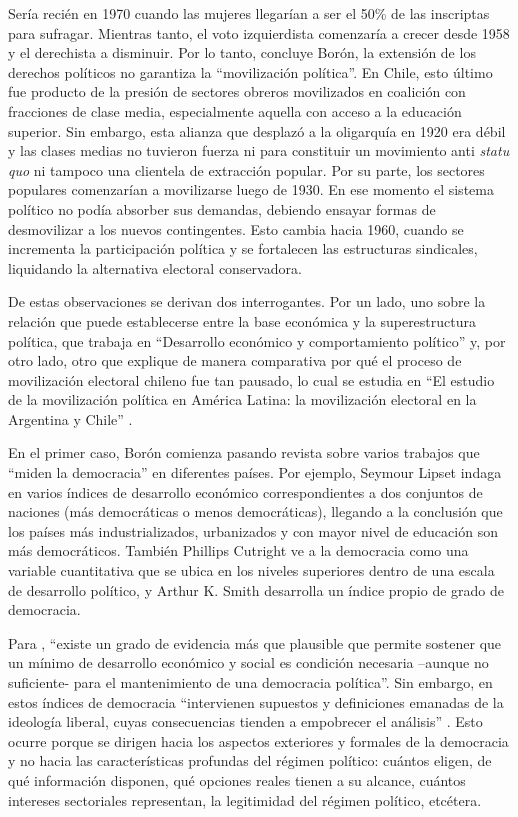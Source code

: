 Sería recién en 1970 cuando las mujeres llegarían a ser el 50\% de las inscriptas para sufragar. Mientras tanto, el voto izquierdista comenzaría a crecer desde 1958 y el derechista a disminuir. Por lo tanto, concluye Borón, la extensión de los derechos políticos no garantiza la \enquote{movilización política}. En Chile, esto último fue producto de la presión de sectores obreros movilizados en coalición con fracciones de clase media, especialmente aquella con acceso a la educación superior. Sin embargo, esta alianza que desplazó a la oligarquía en 1920 era débil y las clases medias no tuvieron fuerza ni para constituir un movimiento anti \emph{statu quo} ni tampoco una clientela de extracción popular. Por su parte, los sectores populares comenzarían a movilizarse luego de 1930. En ese momento el sistema político no podía absorber sus demandas, debiendo ensayar formas de desmovilizar a los nuevos contingentes. Esto cambia hacia 1960, cuando se incrementa la participación política y se fortalecen las estructuras sindicales, liquidando la alternativa electoral conservadora.

De estas observaciones se derivan dos interrogantes. Por un lado, uno sobre la relación que puede establecerse entre la base económica y la superestructura política, que \textcite{1572-BORON1970} trabaja en \enquote{Desarrollo económico y comportamiento político} y, por otro lado, otro que explique de manera comparativa por qué el proceso de movilización electoral chileno fue tan pausado, lo cual se estudia en \enquote{El estudio de la movilización política en América Latina: la movilización electoral en la Argentina y Chile} \parencite{1573-BORON1972}.

En el primer caso, Borón comienza pasando revista sobre varios trabajos que \enquote{miden la democracia} en diferentes países. Por ejemplo, Seymour Lipset indaga en varios índices de desarrollo económico correspondientes a dos conjuntos de naciones (más democráticas o menos democráticas), llegando a la conclusión que los países más industrializados, urbanizados y con mayor nivel de educación son más democráticos. También Phillips Cutright ve a la democracia como una variable cuantitativa que se ubica en los niveles superiores dentro de una escala de desarrollo político, y Arthur K. Smith desarrolla un índice propio de grado de democracia.

Para \textcite[247]{1572-BORON1970}, \enquote{existe un grado de evidencia más que plausible que permite sostener que un mínimo de desarrollo económico y social es condición necesaria --aunque no suficiente- para el mantenimiento de una democracia política}. Sin embargo, en estos índices de democracia \enquote{intervienen supuestos y definiciones emanadas de la ideología liberal, cuyas consecuencias tienden a empobrecer el análisis} \parencite[250]{1572-BORON1970}. Esto ocurre porque se dirigen hacia los aspectos exteriores y formales de la democracia y no hacia las características profundas del régimen político: cuántos eligen, de qué información disponen, qué opciones reales tienen a su alcance, cuántos intereses sectoriales representan, la legitimidad del régimen político, etcétera.

